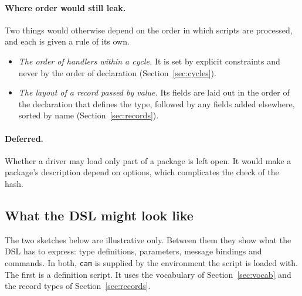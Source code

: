 \documentclass[11pt,a4paper]{article}
\newcommand{\code}[1]{\texttt{#1}}
\begin{document}
\paragraph{Where order would still leak.}  Two things would otherwise depend
on the order in which scripts are processed, and each is given a rule of
its own.

\begin{itemize}
  \item \emph{The order of handlers within a cycle.}  It is set by explicit
        constraints and never by the order of declaration
        (Section~\ref{sec:cycles}).
  \item \emph{The layout of a record passed by value.}  Its fields are laid
        out in the order of the declaration that defines the type, followed
        by any fields added elsewhere, sorted by name
        (Section~\ref{sec:records}).
\end{itemize}

\paragraph{Deferred.}  Whether a driver may load only part of a package is
left open.  It would make a package's description depend on options, which
complicates the check of the hash.

\subsection{What the DSL might look like}
\label{sec:sketch}

The two sketches below are illustrative only.  Between them they show what
the DSL has to express: type definitions, parameters, message bindings and
commands.  In both, \code{cam} is supplied by the environment the script is
loaded with.  The first is a definition script.  It uses the vocabulary of
Section~\ref{sec:vocab} and the record types of Section~\ref{sec:records}.
\end{document}
